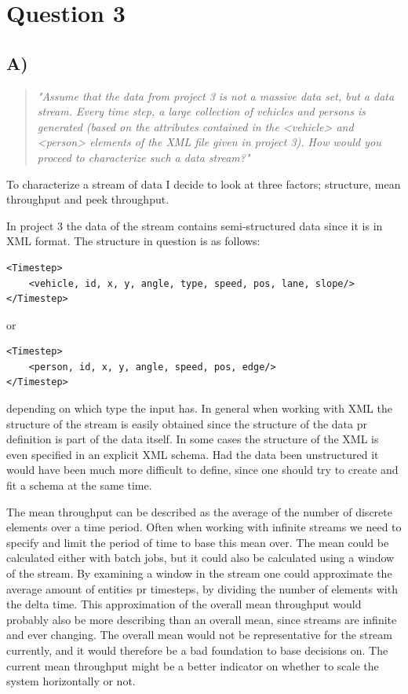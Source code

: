 \section{Question 3}

\subsection{A)}
\begin{quote}
	\textit{"Assume	that	the	data	from	project	3	is	not	a	massive	data	set,	but	a	data	stream.	Every	time	step,	a	large	collection	of	vehicles	and	persons	is	generated	(based	on	the	attributes	contained	in	the	<vehicle>	and	<person>	elements	of	the	XML	file	given	in	project	3).	How	would	you	proceed	to	characterize	such	a	data	stream?"}
\end{quote}
To characterize a stream of data I decide to look at three factors; structure, mean throughput and peek throughput. 

In project 3 the data of the stream contains semi-structured data since it is in XML format. The structure in question is as follows:
\begin{verbatim}
<Timestep>
    <vehicle, id, x, y, angle, type, speed, pos, lane, slope/>
</Timestep>
\end{verbatim}
or 
\begin{verbatim}
<Timestep>
    <person, id, x, y, angle, speed, pos, edge/>
</Timestep>
\end{verbatim}
depending on which type the input has. In general when working with XML the structure of the stream is easily obtained since the structure of the data pr definition is part of the data itself. In some cases the structure of the XML is even specified in an explicit XML schema. Had the data been unstructured it would have been much more difficult to define, since one should try to create and fit a schema at the same time.

The mean throughput can be described as the average of the number of discrete elements over a time period. Often when working with infinite streams we need to specify and limit the period of time to base this mean over. The mean could be calculated either with batch jobs, but it could also be calculated using a window of the stream. By examining a window in the stream one could approximate the average amount of entities pr timesteps, by dividing the number of elements with the delta time. This approximation of the overall mean throughput would probably also be more describing than an overall mean, since streams are infinite and ever changing. The overall mean would not be representative for the stream currently, and it would therefore be a bad foundation to base decisions on. The current mean throughput might be a better indicator on whether to scale the system horizontally or not.

